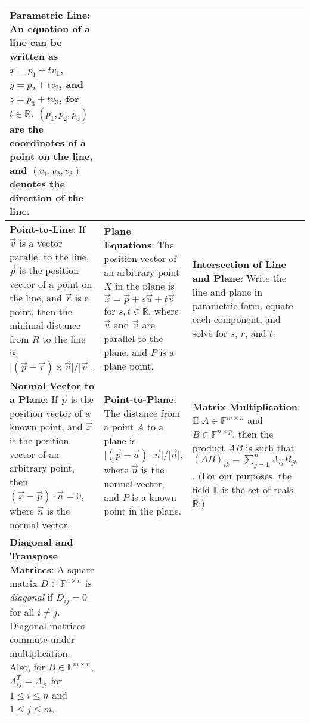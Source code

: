 \begin{tabular}{|m{.31\linewidth}|m{.31\linewidth}|m{.31\linewidth}|}
\textbf{Parametric Line}:
    An equation of a line can be written as $ x = p_1 + tv_1 $,
    $ y = p_2 + tv_2 $, and $ z = p_3 + tv_3 $, for $ t \in \mathbb{R} $.
    $ (p_1, p_2, p_3) $ are the coordinates of a point on the line, and
    $ (v_1, v_2, v_3) $ denotes the direction of the line. \\

\hline

\textbf{Point-to-Line}:
    If $ \vec{v} $ is a vector parallel to the line, $ \vec{p} $ is the position
    vector of a point on the line, and $ \vec{r} $ is a point, then the minimal
    distance from $ R $ to the line is $ \vert (\vec{p} - \vec{r}) \times
    \vec{v} \vert/\vert\vec{v}\vert $. &

\textbf{Plane Equations}:
    The position vector of an arbitrary point $ X $ in the plane is
    $ \vec{x} = \vec{p} + s \vec{u} + t \vec{v} $ for $ s, t \in \mathbb{R} $,
    where $ \vec{u} $ and $ \vec{v} $ are parallel to the plane, and $ P $ is a
    plane point. &

\textbf{Intersection of Line and Plane}:
    Write the line and plane in parametric form, equate each component, and
    solve for $ s $, $ r $, and $ t $. \\

\hline

\textbf{Normal Vector to a Plane}:
    If $ \vec{p} $ is the position vector of a known point, and $ \vec{x} $ is
    the position vector of an arbitrary point, then $ ( \vec{x} - \vec{p} )
    \cdot \vec{n} = 0 $, where $ \vec{n} $ is the normal vector. &

\textbf{Point-to-Plane}:
    The distance from a point $ A $ to a plane is
    $ \vert (\vec{p} - \vec{a}) \cdot \vec{n} \vert / \vert \vec{n} \vert $,
    where $ \vec{n} $ is the normal vector, and $ P $ is a known point in the
    plane. &

\textbf{Matrix Multiplication}:
    If $ A \in \mathbb{F}^{m \times n} $ and $ B \in \mathbb{F}^{n \times p} $,
    then the product $ AB $ is such that $ (AB)_{ik} = \sum_{j=1}^n A_{ij}
    B_{jk} $. (For our purposes, the field $ \mathbb{F} $ is the set of reals
    $ \mathbb{R} $.) \\

\hline

\textbf{Diagonal and Transpose Matrices}:
    A square matrix $ D \in \mathbb{F}^{n \times n} $ is \emph{diagonal} if
    $ D_{ij} = 0 $ for all $ i \neq j $. Diagonal matrices commute under
    multiplication. Also, for $ B \in \mathbb{F}^{m \times n}$, $ A^T_{ij} =
    A_{ji} $ for $ 1 \leq i \leq n $ and $ 1 \leq j \leq m $. &


\end{tabular}

